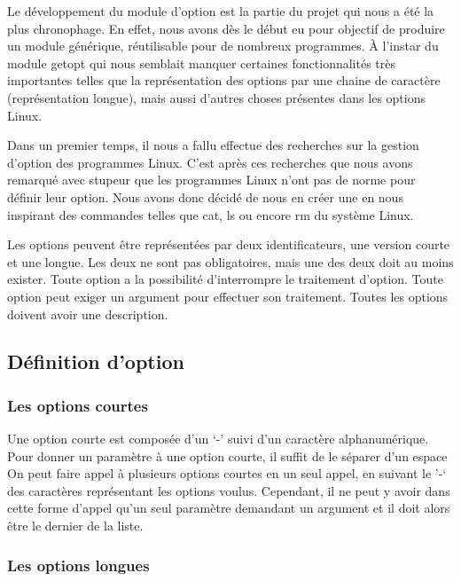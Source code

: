 \documentclass[12pt]{article}
\begin{document}
    Le développement du module d'option est la partie du projet qui nous a été 
    la plus chronophage. En effet, nous avons dès le début eu pour objectif de 
    produire un module générique, réutilisable pour de nombreux programmes. À 
    l'instar du module getopt qui nous semblait manquer certaines 
    fonctionnalités très importantes telles que la représentation des options 
    par une chaine de caractère (représentation longue), mais aussi d'autres 
    choses présentes dans les options Linux. 

    Dans un premier temps, il nous a fallu effectue des recherches sur la 
    gestion d'option des programmes Linux. C'est après ces recherches que nous 
    avons remarqué avec stupeur que les programmes Linux n'ont pas de norme pour 
    définir leur option. Nous avons donc décidé de nous en créer une en 
    nous inspirant des commandes telles que cat, ls ou encore rm du système 
    Linux.

    Les options peuvent être représentées par deux identificateurs, une version 
    courte et une longue. Les deux ne sont pas obligatoires, mais une des deux 
    doit au moins exister. Toute option a la possibilité d'interrompre le 
    traitement d'option. Toute option peut exiger un argument pour effectuer son 
    traitement. Toutes les options doivent avoir une description. 

    \subsection{Définition d'option}

    \subsubsection{Les options courtes}

    Une option courte est composée d'un `-' suivi d'un caractère 
    alphanumérique. Pour donner un paramètre à une option courte, il suffit de 
    le séparer d'un espace On peut faire appel à plusieurs options courtes en 
    un seul  appel, en suivant le '-` des caractères représentant les options 
    voulus. Cependant, il ne peut y avoir dans cette forme d'appel qu'un seul 
    paramètre demandant un argument et il doit alors être le dernier de la 
    liste. 

    \subsubsection{Les options longues}
\end{document}
